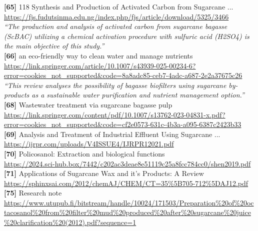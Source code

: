 \textbf{[65]} 118 Synthesis and Production of Activated Carbon from Sugarcane ...\\[0.15em]
\url{https://fjs.fudutsinma.edu.ng/index.php/fjs/article/download/5325/3466}\\[0.2em]
\emph{``The production and analysis of activated carbon from sugarcane bagasse (ScBAC) utilizing a chemical activation procedure with sulfuric acid (H2SO4) is the main objective of this study.''}\\[0.45em]

\textbf{[66]} an eco-friendly way to clean water and manage nutrients\\[0.15em]
\url{https://link.springer.com/article/10.1007/s43939-025-00234-6?error=cookies_not_supported&code=8a8adc85-ceb7-4adc-a687-2e2a37675c26}\\[0.2em]
\emph{``This review analyses the possibility of bagasse biofilters using sugarcane by-products as a sustainable water purification and nutrient management option.''}\\[0.45em]

\textbf{[68]} Wastewater treatment via sugarcane bagasse pulp\\[0.15em]
\url{https://link.springer.com/content/pdf/10.1007/s13762-023-04831-x.pdf?error=cookies_not_supported&code=cf2e0573-631c-4b3a-a095-6387c2423b33}\\[0.2em]

\textbf{[69]} Analysis and Treatment of Industrial Effluent Using Sugarcane ...\\[0.15em]
\url{https://ijrpr.com/uploads/V4ISSUE4/IJRPR12021.pdf}\\[0.2em]

\textbf{[70]} Policosanol: Extraction and biological functions\\[0.15em]
\url{https://2024.sci-hub.box/7442/c202ac3deae8e51119c25a8fcc784cc0/shen2019.pdf}\\[0.2em]

\textbf{[71]} Applications of Sugarcane Wax and it's Products: A Review\\[0.15em]
\url{https://sphinxsai.com/2012/chemAJ/CHEM/CT=35\%5B705-712\%5DAJ12.pdf}\\[0.2em]

\textbf{[75]} Research note\\[0.15em]
\url{https://www.utupub.fi/bitstream/handle/10024/171503/Preparation\%20of\%20octacosanol\%20from\%20filter\%20mud\%20produced\%20after\%20sugarcane\%20juice\%20clarification\%20(2012).pdf?sequence=1}\\[0.2em]

